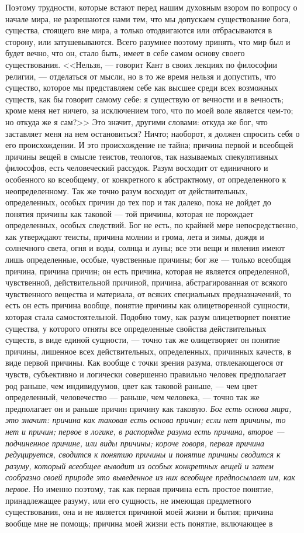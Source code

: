 \documentclass[12pt]{article}
\begin{document}
Поэтому трудности, которые встают перед нашим духовным взором по вопросу о начале мира, не разрешаются нами тем, что мы допускаем существование бога, существа, стоящего вне мира, а только отодвигаются или отбрасываются в сторону, или затушевываются. Всего разумнее поэтому принять, что мир был и будет вечно, что он, стало быть, имеет в себе самом основу своего существования. <<Нельзя, --- говорит Кант в своих лекциях по философии религии, --- отделаться от мысли, но в то же время нельзя и допустить, что существо, которое мы представляем себе как высшее среди всех возможных существ, как бы говорит самому себе: я существую от вечности и в вечность; кроме меня нет ничего, за исключением того, что по моей воле является чем-то; но откуда же я сам?>> Это значит, другими словами: откуда же бог, что заставляет меня на нем остановиться? Ничто; наоборот, я должен спросить себя о его происхождении. И это происхождение не тайна; причина первой и всеобщей причины вещей в смысле теистов, теологов, так называемых спекулятивных философов, есть человеческий рассудок. Разум восходит от единичного и особенного ко всеобщему, от конкретного к абстрактному, от определенного к неопределенному. Так же точно разум восходит от действительных, определенных, особых причин до тех пор и так далеко, пока не дойдет до понятия причины как таковой --- той причины, которая не порождает определенных, особых следствий. Бог не есть, по крайней мере непосредственно, как утверждают теисты, причина молнии и грома, лета и зимы, дождя и солнечного света, огня и воды, солнца и луны; все эти вещи и явления имеют лишь определенные, особые, чувственные причины; бог же --- только всеобщая причина, причина причин; он есть причина, которая не является определенной, чувственной, действительной причиной, причина, абстрагированная от всякого чувственного вещества и материала, от всяких специальных предназначений, то есть он есть причина вообще, понятие причины как олицетворенной сущности, которая стала самостоятельной. Подобно тому, как разум олицетворяет понятие существа, у которого отняты все определенные свойства действительных существ, в виде единой сущности, --- точно так же олицетворяет он понятие причины, лишенное всех действительных, определенных, причинных качеств, в виде первой причины. Как вообще с точки зрения разума, отвлекающегося от чувств, субъективно и логически совершенно правильно человек предполагает род раньше, чем индивидуумов, цвет как таковой раньше, --- чем цвет определенный, человечество --- раньше, чем человека, --- точно так же предполагает он и раньше причин причину как таковую. \emph{Бог есть основа мира, это значит: причина как таковая есть основа причин; если нет причины, то нет и причин; первое в логике, в распорядке разума есть причина, второе --- подчиненное причине, или виды причины; короче говоря, первая причина редуцируется, сводится к понятию причины и понятие причины сводится к разуму, который всеобщее выводит из особых конкретных вещей и затем сообразно своей природе это выведенное из них всеобщее предпосылает им, как первое}. Но именно поэтому, так как первая причина есть простое понятие, принадлежащее разуму, или его сущность, не имеющая предметного существования, она и не является причиной моей жизни и бытия; причина вообще мне не помощь; причина моей жизни есть понятие, включающее в 
\end{document}
